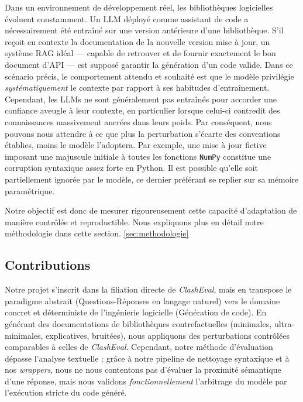 \documentclass[11pt, a4paper]{article}
\begin{document}
Dans un environnement de développement réel, les bibliothèques logicielles évoluent constamment. Un LLM déployé comme assistant de code a nécessairement été entraîné sur une version antérieure d'une bibliothèque. S'il reçoit en contexte la documentation de la nouvelle version mise à jour, un système RAG idéal --- capable de retrouver et de fournir exactement le bon document d'API --- est supposé garantir la génération d'un code valide. Dans ce scénario précis, le comportement attendu et souhaité est que le modèle privilégie \textit{systématiquement} le contexte par rapport à ses habitudes d'entraînement. Cependant, les LLMs ne sont généralement pas entraînés pour accorder une confiance aveugle à leur contexte, en particulier lorsque celui-ci contredit des connaissances massivement ancrées dans leurs poids. Par conséquent, nous pouvons nous attendre à ce que plus la perturbation s'écarte des conventions établies, moins le modèle l'adoptera. Par exemple, une mise à jour fictive imposant une majuscule initiale à toutes les fonctions \texttt{NumPy} constitue une corruption syntaxique assez forte en Python. Il est possible qu'elle soit partiellement ignorée par le modèle, ce dernier préférant se replier sur sa mémoire paramétrique.

Notre objectif est donc de mesurer rigoureusement cette capacité d'adaptation de manière contrôlée et reproductible. Nous expliquons plus en détail notre méthodologie dans cette section. \ref{sec:methodologie} 

\subsection{Contributions}

Notre projet s'inscrit dans la filiation directe de \textit{ClashEval}, mais en transpose le paradigme abstrait (Questions-Réponses en langage naturel) vers le domaine concret et déterministe de l'ingénierie logicielle (Génération de code). En générant des documentations de bibliothèques contrefactuelles (minimales, ultra-minimales, explicatives, bruitées), nous appliquons des perturbations contrôlées comparables à celles de \textit{ClashEval}. Cependant, notre méthode d'évaluation dépasse l'analyse textuelle : grâce à notre pipeline de nettoyage syntaxique et à nos \textit{wrappers}, nous ne nous contentons pas d'évaluer la proximité sémantique d'une réponse, mais nous validons \textit{fonctionnellement} l'arbitrage du modèle par l'exécution stricte du code généré.
\end{document}
